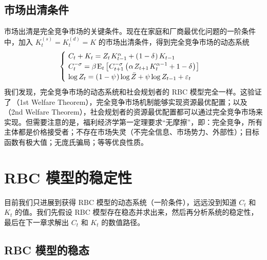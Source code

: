 \subsection{市场出清条件}\label{subsec:MarketClear}

市场出清是完全竞争市场的关键条件。现在在家庭和厂商最优化问题的一阶条件中，加入 \(K^{(s)}_t=K^{(d)}_t=K\) 的市场出清条件，得到完全竞争市场的动态系统
\begin{equation*}
    \begin{cases}
        \ C_t+K_t=Z_t\,K\lt^\alpha+\bka{1-\delta}K\lt \\
        \ C_t^{-\sigma}=\beta\,\mean_t\bks{C_{t+1}^{-\sigma}\bka{\alpha\, Z_{t+1}\,K_t^{\alpha-1}+1-\delta}}\\
        \ \log Z_t=\bka{1-\psi}\log\bar Z+\psi\log Z\lt+\varepsilon_t
    \end{cases}
\end{equation*}
我们发现，完全竞争市场的动态系统和社会规划者的 RBC 模型完全一样。这验证了\,（1st Welfare Theorem），完全竞争市场机制能够实现资源最优配置；以及\,（2nd Welfare Theorem），社会规划者的资源最优配置都可以通过完全竞争市场来实现。但需要注意的是，福利经济学第一定理要求“无摩擦”，即：完全竞争，所有主体都是价格接受者；不存在市场失灵（不完全信息、市场势力、外部性）；目标函数有极大值；无庞氏骗局；等等优良性质。

\section{RBC 模型的稳定性}\label{sec:RBCStable}

目前我们只进展到获得 RBC 模型的动态系统（一阶条件），远远没到知道 \(C_t\) 和 \(K_t\) 的值。我们先假设 RBC 模型存在稳态并求出来，然后再分析系统的稳定性，最后在下一章求解出 \(C_t\) 和 \(K_t\) 的数值路径。

\subsection{RBC 模型的稳态}\label{subsec:RBCSS}

